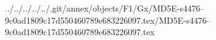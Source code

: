 ../../../../../.git/annex/objects/F1/Gx/MD5E-s4476--9c0ad1809c17d550460789e683226097.tex/MD5E-s4476--9c0ad1809c17d550460789e683226097.tex